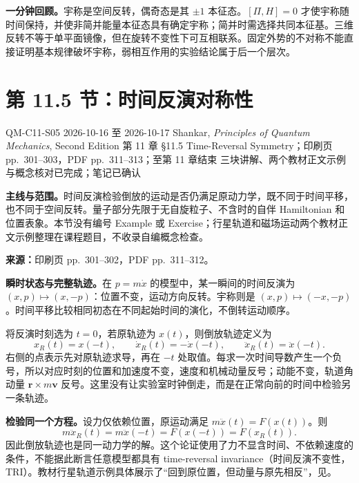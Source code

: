 \textbf{一分钟回顾。}宇称是空间反转，偶奇态是其 $\pm1$ 本征态。$[\Pi,H]=0$ 才使宇称随时间保持，并使非简并能量本征态具有确定宇称；简并时需选择共同本征基。三维反转不等于单平面镜像，但在旋转不变性下可互相联系。固定外势的不对称不能直接证明基本规律破坏宇称，弱相互作用的实验结论属于后一个层次。

\section{第 11.5 节：时间反演对称性}
\label{section:QM-C11-S05}
\studymeta
  {QM-C11-S05}
  {2026-10-16 至 2026-10-17}
  {Shankar, \textit{Principles of Quantum Mechanics}, Second Edition}
  {第 11 章 \S 11.5 Time-Reversal Symmetry；印刷页 pp.~301--303，PDF pp.~311--313；至第 11 章结束}
  {三块讲解、两个教材正文示例与概念核对已完成；笔记已确认}

\textbf{主线与范围。}时间反演检验倒放的运动是否仍满足原动力学，既不同于时间平移，也不同于空间反转。量子部分先限于无自旋粒子、不含时的自伴 Hamiltonian 和位置表象。本节没有编号 Example 或 Exercise；行星轨道和磁场运动两个教材正文示例整理在课程题目，不收录自编概念检查。

\textbf{来源：}印刷页 pp.~301--302，PDF pp.~311--312。

\textbf{瞬时状态与完整轨迹。}在 $p=m\dot x$ 的模型中，某一瞬间的时间反演为 $(x,p)\mapsto(x,-p)$：位置不变，运动方向反转。宇称则是 $(x,p)\mapsto(-x,-p)$。时间平移比较相同初态在不同起始时间的演化，不倒转运动顺序。

将反演时刻选为 $t=0$，若原轨迹为 $x(t)$，则倒放轨迹定义为
\begin{equation}
  \boxed{x_R(t)=x(-t)},\qquad
  \dot x_R(t)=-\dot x(-t),\qquad
  \ddot x_R(t)=\ddot x(-t).
\end{equation}
右侧的点表示先对原轨迹求导，再在 $-t$ 处取值。每求一次时间导数产生一个负号，所以对应时刻的位置和加速度不变，速度和机械动量反号；动能不变，轨道角动量 $\mathbf r\times m\mathbf v$ 反号。这里没有让实验室时钟倒走，而是在正常向前的时间中检验另一条轨迹。

\textbf{检验同一个方程。}设力仅依赖位置，原运动满足 $m\ddot x(t)=F(x(t))$。则
\begin{equation}
  m\ddot x_R(t)=m\ddot x(-t)
    =F(x(-t))=F(x_R(t)).
\end{equation}
因此倒放轨迹也是同一动力学的解。这个论证使用了力不显含时间、不依赖速度的条件，不能据此断言任意模型都具有 time-reversal invariance（时间反演不变性，TRI）。教材行星轨道示例具体展示了“回到原位置，但动量与原先相反”，见。

